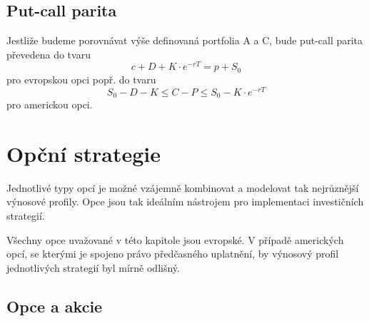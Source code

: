 \documentclass[a4paper]{book}
\begin{document}
\subsection{Put-call parita}
Jestliže budeme porovnávat výše definovaná portfolia A a C, bude put-call parita převedena do tvaru
\begin{equation*}
c+D+K \cdot e^{-rT} = p + S_0
\end{equation*}
pro evropskou opci popř. do tvaru
\begin{equation*}
S_0 - D -K \le C - P \le S_0 - K \cdot e^{-rT}
\end{equation*}
pro americkou opci.

\section{Opční strategie}

Jednotlivé typy opcí je možné vzájemně kombinovat a modelovat tak nejrůznější výnosové profily. Opce jsou tak ideálním nástrojem pro implementaci investičních strategií.

Všechny opce uvažované v této kapitole jsou evropské. V případě amerických opcí, se kterými je spojeno právo předčasného uplatnění, by výnosový profil jednotlivých strategií byl mírně odlišný.

\subsection{Opce a akcie}
\end{document}
